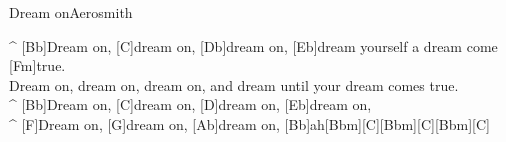 \begin{song}{Dream on}{Aerosmith}


\medskip
\begin{guitar}
^ [Bb]Dream on, [C]dream on, [Db]dream on, [Eb]dream yourself a dream come [Fm]true.\\
Dream on, dream on, dream on, and dream until your dream comes true.\\
^ [Bb]Dream on, [C]dream on, [D]dream on, [Eb]dream on,\\
^ [F]Dream on, [G]dream on, [Ab]dream on, [Bb]ah[Bbm][C][Bbm][C][Bbm][C]\\
\end{guitar}

\end{song}
